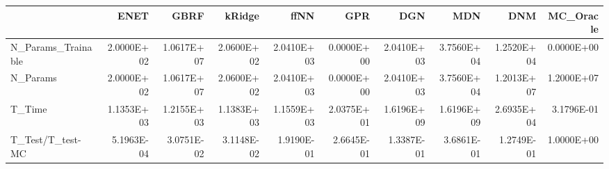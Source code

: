 \begin{tabular}{lrrrrrrrrr}
\toprule
{} &       ENET &       GBRF &     kRidge &       ffNN &        GPR &        DGN &        MDN &        DNM &  MC\_Oracle \\
\midrule
N\_Params\_Trainable & 2.0000E+02 & 1.0617E+07 & 2.0600E+02 & 2.0410E+03 & 0.0000E+00 & 2.0410E+03 & 3.7560E+04 & 1.2520E+04 & 0.0000E+00 \\
N\_Params           & 2.0000E+02 & 1.0617E+07 & 2.0600E+02 & 2.0410E+03 & 0.0000E+00 & 2.0410E+03 & 3.7560E+04 & 1.2013E+07 & 1.2000E+07 \\
T\_Time             & 1.1353E+03 & 1.2155E+03 & 1.1383E+03 & 1.1559E+03 & 2.0375E+01 & 1.6196E+09 & 1.6196E+09 & 2.6935E+04 & 3.1796E-01 \\
T\_Test/T\_test-MC   & 5.1963E-04 & 3.0751E-02 & 3.1148E-02 & 1.9190E-01 & 2.6645E-01 & 1.3387E-01 & 3.6861E-01 & 1.2749E-01 & 1.0000E+00 \\
\bottomrule
\end{tabular}
